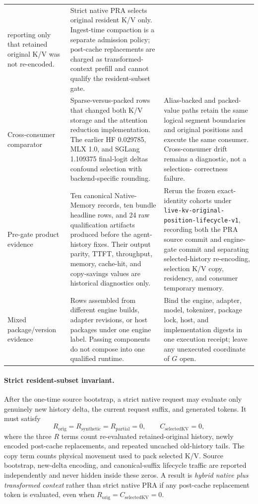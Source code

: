 \documentclass[11pt]{article}
\begin{document}
\begin{longtable}{@{}p{}p{}p{}@{}}
reporting only that retained original K/V was not re-encoded. & Strict native
PRA selects original resident K/V only.  Ingest-time compaction is a separate
admission policy; post-cache replacements are charged as transformed-context
prefill and cannot qualify the resident-subset gate. \\
\addlinespace
Cross-consumer comparator & Sparse-versus-packed rows that changed both K/V
storage and the attention reduction implementation.  The earlier HF 0.029785,
MLX 1.0, and SGLang 1.109375 final-logit deltas confound selection with
backend-specific rounding. & Alias-backed and packed-value paths retain the
same logical segment boundaries and original positions and execute the same
consumer.  Cross-consumer drift remains a diagnostic, not a selection-
correctness failure. \\
\addlinespace
Pre-gate product evidence & Ten canonical Native-Memory records, ten bundle
headline rows, and 24 raw qualification artifacts produced before the agent-
history fixes. Their output parity, TTFT, throughput, memory, cache-hit, and
copy-savings values are historical diagnostics only. & Rerun the frozen exact-
identity cohorts under
\texttt{live-kv-original-\allowbreak position-\allowbreak lifecycle-v1},
recording both the PRA source
commit and engine-gate commit and separating selected-history re-encoding,
selection K/V copy, residency, and consumer temporary memory. \\
\addlinespace
Mixed package/version evidence & Rows assembled from different engine builds,
adapter revisions, or host packages under one engine label.  Passing components
do not compose into one qualified runtime. & Bind the engine, adapter, model,
tokenizer, package lock, host, and implementation digests in one execution
receipt; leave any unexecuted coordinate of $G$ open. \\
\bottomrule
\end{longtable}
\endgroup

\paragraph{Strict resident-subset invariant.}
After the one-time source bootstrap, a strict native request may evaluate only
genuinely new history delta, the current request suffix, and generated tokens.
It must satisfy
\[
R_{\mathrm{orig}}=R_{\mathrm{synthetic}}=R_{\mathrm{partial}}=0,
\qquad C_{\mathrm{selectedKV}}=0,
\]
where the three $R$ terms count re-evaluated retained-original history,
newly encoded post-cache replacements, and repeated uncached old-history tails.
The copy term counts physical movement used to pack selected K/V.  Source
bootstrap, new-delta encoding, and canonical-suffix lifecycle traffic are
reported independently and never hidden inside these zeros.  A result is
\emph{hybrid native plus transformed context} rather than strict native PRA if
any post-cache replacement token is evaluated, even when
$R_{\mathrm{orig}}=C_{\mathrm{selectedKV}}=0$.
\end{document}
